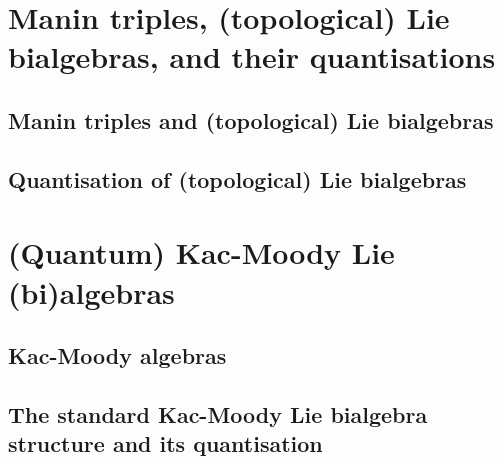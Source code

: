     

    

    \begin{appendices}
        \section{Manin triples, (topological) Lie bialgebras, and their quantisations} 
            \subsection{Manin triples and (topological) Lie bialgebras} \label{subsection: manin_triples}
                

                

            \subsection{Quantisation of (topological) Lie bialgebras}
                
    
        \section{(Quantum) Kac-Moody Lie (bi)algebras}
            \subsection{Kac-Moody algebras} \label{subsection: setup_kac_moody_algebras}
                

            \subsection{The standard Kac-Moody Lie bialgebra structure and its quantisation} \label{subsection: setup_standard_kac_moody_lie_bialgebras}
                

                
    \end{appendices}
	
    \printbibliography

